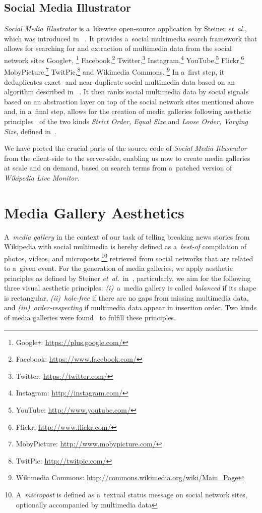 \documentclass{sig-alternate}
\newcommand{\inlinelistingsize}{\fontsize{8pt}{11pt}}
\let\oldurl\url
\renewcommand{\url}[1]{\inlinelistingsize\oldurl{#1}}
\begin{document}
\subsection{Social Media Illustrator}

\emph{Social Media Illustrator} is a~likewise
open-source application by Steiner \emph{et~al.},
which was introduced in%
~\cite{steiner2013meteoroid,steiner2013tocrop}.
It provides a~social multimedia search framework
that allows for searching for and extraction of
multimedia data from the social network sites
Google\texttt{+},%
\footnote{Google\texttt{+}: \url{https://plus.google.com/}}
Facebook,\footnote{Facebook: \url{https://www.facebook.com/}}
Twitter,\footnote{Twitter: \url{https://twitter.com/}}
Instagram,\footnote{Instagram: \url{http://instagram.com/}}
YouTube,\footnote{YouTube: \url{http://www.youtube.com/}}
Flickr,\footnote{Flickr: \url{http://www.flickr.com/}}
MobyPicture,\footnote{MobyPicture: \url{http://www.mobypicture.com/}}
TwitPic,\footnote{TwitPic: \url{http://twitpic.com/}}
and Wikimedia Commons.%
\footnote{Wikimedia Commons: \url{http://commons.wikimedia.org/wiki/Main_Page}}
In a~first step, it deduplicates exact- and near-duplicate
social multimedia data based on an algorithm described in%
~\cite{steiner2013clustering}.
It then ranks social multimedia data by social signals%
~\cite{steiner2013meteoroid} based on an abstraction layer
on top of the social network sites mentioned above
and, in a~final step, allows for the creation of media galleries
following aesthetic principles~\cite{steiner2012aesthetic}
of the two kinds \emph{Strict Order, Equal Size}
and \emph{Loose Order, Varying Size},
defined in~\cite{steiner2013tocrop}.

We have ported the crucial parts
of the source code of \emph{Social Media Illustrator}
from the client-side to the server-side,
enabling us now to create media galleries at scale and on demand,
based on search terms from a~patched version of \emph{Wikipedia Live Monitor}.

\section{Media Gallery Aesthetics}
\selectfont

A~\emph{media gallery} in the context of our task of
telling breaking news stories from Wikipedia with social multimedia
is hereby defined as a~\emph{best-of} compilation of photos, videos,
and microposts%
\footnote{A~\emph{micropost} is defined as a~textual status message
on social network sites, optionally accompanied by multimedia data}
retrieved from social networks that are related to a~given event.
For the generation of media galleries, we apply aesthetic principles
as defined by Steiner \emph{et~al.}\
in~\cite{steiner2013tocrop,steiner2012aesthetic},
particularly, we aim for the following
three visual aesthetic principles:
\emph{(i)}~a~media gallery is called \emph{balanced}
if its shape is rectangular,
\emph{(ii)}~\emph{hole-free}
if there are no gaps from missing multimedia data,
and \emph{(iii)}~\emph{order-respecting}
if multimedia data appear in insertion order.
Two kinds of media galleries were found~\cite{steiner2013tocrop}
to fulfill these principles.
\end{document}
